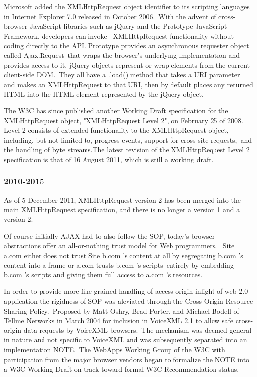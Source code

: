 \documentclass[a4paper,12pt]{paper}
\begin{document}
Microsoft added the XMLHttpRequest object identifier to its scripting languages in Internet Explorer 7.0 released in October 2006.\
With the advent of cross-browser JavaScript libraries such as jQuery and the Prototype JavaScript Framework, developers can invoke \
XMLHttpRequest functionality without coding directly to the API. Prototype provides an asynchronous requester object called Ajax.Request\
that wraps the browser's underlying implementation and provides access to it. jQuery objects represent or wrap elements from the current client-side DOM.\
They all have a .load() method that takes a URI parameter and makes an XMLHttpRequest to that URI, then by default places any returned HTML into the HTML element represented by the jQuery object.\

The W3C has since published another Working Draft specification for the XMLHttpRequest object, "XMLHttpRequest Level 2", on February 25 of 2008.
Level 2 consists of extended functionality to the XMLHttpRequest object, including, but not limited to, progress events, support for cross-site requests,\
and the handling of byte streams.The latest revision of the XMLHttpRequest Level 2 specification is that of 16 August 2011, which is still a working draft.\

\subsubsection{2010-2015}

As of 5 December 2011, XMLHttpRequest version 2 has been merged into the main XMLHttpRequest specification, and there is no longer a version 1 and a version 2.\

Of course initially AJAX had to also follow the SOP, today’s browser abstractions offer an all-or-nothing trust model for Web programmers. \
Site a.com either does not trust Site b.com ’s content at all by segregating b.com ’s content into a frame or a.com trusts b.com ’s scripts\
entirely by embedding b.com ’s scripts and giving them full access to a.com ’s resources.\

In order to provide more fine grained handling of access origin inlight of web 2.0 application the rigidness of SOP was aleviated through the Cross Origin Resource Sharing Policy.\
Proposed by Matt Oshry, Brad Porter, and Michael Bodell of Tellme Networks in March 2004 for inclusion in VoiceXML 2.1 to allow safe cross-origin data requests by VoiceXML browsers.\
The mechanism was deemed general in nature and not specific to VoiceXML and was subsequently separated into an implementation NOTE.\
The WebApps Working Group of the W3C with participation from the major browser vendors began to formalize the NOTE into a W3C Working Draft on track toward formal W3C Recommendation status.\\
\end{document}
